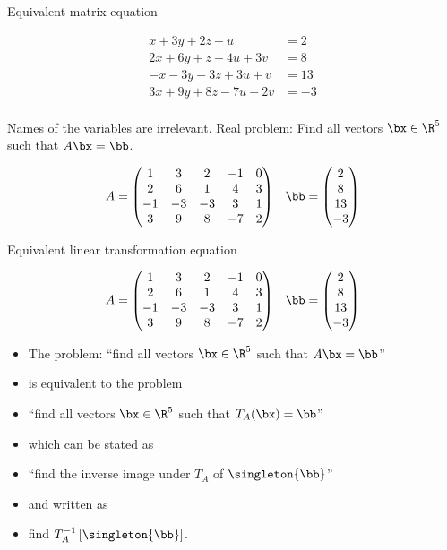 \documentclass[handout]{beamer}
\begin{document}
\begin{frame}{Equivalent matrix equation}

\begin{align*}
 x + 3y + 2z - u  \qquad &= 2 \\
2x + 6y + z + 4u + 3v  &= 8 \\
-x -3y  -3z + 3u + v  &= 13 \\
3x + 9y + 8z  -7u + 2v  &= -3 \\
\end{align*}

Names of the variables are irrelevant. Real problem: Find all vectors $\bx \in \R^5$ such that $A \bx = \bb$.

$$
\begin{matrix}
A =
\begin{pmatrix}
1 & 3 & 2 & -1 & 0 \\
2 & 6 & 1 & 4 & 3\\
-1 & -3 & -3 & 3 & 1 \\
3 & 9 & 8 & -7 & 2
\end{pmatrix}
&
\bb =
\begin{pmatrix}
2 \\ 8 \\ 13 \\ -3
\end{pmatrix}
\end{matrix}
$$

\end{frame}


\begin{frame}{Equivalent linear transformation equation}

$$
\begin{matrix}
A =
\begin{pmatrix}
1 & 3 & 2 & -1 & 0 \\
2 & 6 & 1 & 4 & 3\\
-1 & -3 & -3 & 3 & 1 \\
3 & 9 & 8 & -7 & 2
\end{pmatrix}
&
\bb =
\begin{pmatrix}
2 \\ 8 \\ 13 \\ -3
\end{pmatrix}
\end{matrix}
$$

\begin{itemize}
\item The problem: ``find all vectors $\bx \in \R^5$ such that $A \bx = \bb$''
\item is equivalent to the problem
\item ``find all vectors $\bx \in \R^5$ such that $T_A(\bx) = \bb$''
\item which can be stated as
\item ``find the inverse image under $T_A$ of $\singleton{\bb}$''
\item and written as
\item find $T_A^{-1} \left[ \singleton{\bb}\right]$.
\end{itemize}

\end{frame}
\end{document}
